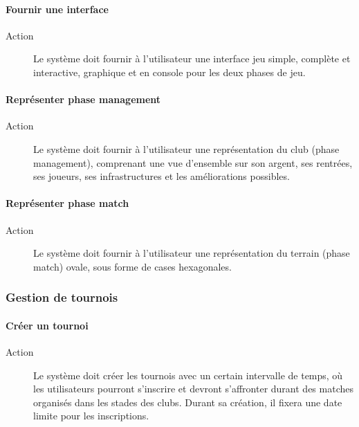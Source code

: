 \documentclass[a4paper]{article}
\begin{document}
\paragraph{Fournir une interface}
\begin{description}
\item[Action] Le système doit fournir à l'\gls{utilisateur} une interface jeu simple, complète et interactive, graphique et en console pour les deux phases de jeu.
\end{description}

\paragraph{Représenter phase management}
\begin{description}
\item[Action] Le système doit fournir à l'\gls{utilisateur} une représentation du \gls{club} (phase management), comprenant une vue d'ensemble sur son argent, ses rentrées, ses \glspl{joueur}, ses infrastructures et les améliorations possibles.
\end{description}

\paragraph{Représenter phase match}
\begin{description}
\item[Action] Le système doit fournir à l'\gls{utilisateur} une représentation du terrain (phase match) ovale, sous forme de cases hexagonales.
\end{description}

\subsubsection{Gestion de tournois}
\paragraph{Créer un tournoi}
\begin{description}
\item[Action] Le système doit créer les tournois avec un certain intervalle de temps, où les \glspl{utilisateur} pourront s'inscrire et devront s'affronter durant des matches organisés dans les stades des \glspl{club}.
Durant sa création, il fixera une date limite pour les inscriptions.
\end{description}
\end{document}
